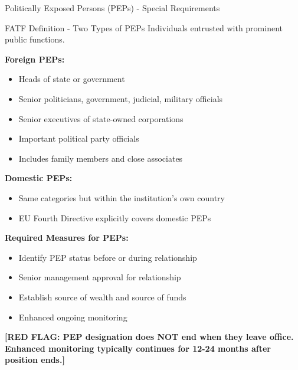 \documentclass[11pt,a4paper]{beamer}
\newcommand{\redflag}[1]{\textcolor{red!80!black}{\textbf{[RED FLAG: #1]}}}
\begin{document}
	\begin{frame}{Politically Exposed Persons (PEPs) - Special Requirements}
		\begin{block}{FATF Definition - Two Types of PEPs}
			Individuals entrusted with prominent public functions.
		\end{block}
		\textbf{Foreign PEPs:}
		\begin{itemize}
			\item Heads of state or government
			\item Senior politicians, government, judicial, military officials
			\item Senior executives of state-owned corporations
			\item Important political party officials
			\item Includes family members and close associates
		\end{itemize}
		\textbf{Domestic PEPs:}
		\begin{itemize}
			\item Same categories but within the institution's own country
			\item EU Fourth Directive explicitly covers domestic PEPs
		\end{itemize}
		\textbf{Required Measures for PEPs:}
		\begin{itemize}
			\item Identify PEP status before or during relationship
			\item Senior management approval for relationship
			\item Establish source of wealth and source of funds
			\item Enhanced ongoing monitoring
		\end{itemize}
		\redflag{PEP designation does NOT end when they leave office. Enhanced monitoring typically continues for 12-24 months after position ends.}
	\end{frame}
	
\end{document}
